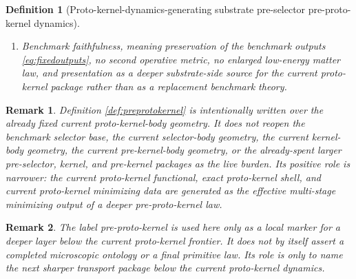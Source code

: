 \documentclass[11pt]{article}
\newcommand{\YoctoSelectorBody}[1]{\mathcal B_{#1}^{\mathrm{yoc,sel}}}
\newcommand{\YoctoSelectorShell}[1]{\mathcal Z_{#1}^{\mathrm{yoc,sel}}}
\newcommand{\PreSectionSelectorProj}[1]{\Pi_{#1}^{\mathrm{presel,sel}}}
\newcommand{\KernelProj}[1]{\Lambda_{#1}^{\mathrm{presel,ker}}}
\newcommand{\PreKernelProj}[1]{\Upsilon_{#1}^{\mathrm{presel,preker}}}
\newcommand{\ProtoKernelProj}[1]{\Omega_{#1}^{\mathrm{presel,proker}}}
\newcommand{\PreProtoKernelBody}[1]{\mathcal D_{#1}^{\mathrm{presel,preproker}}}
\newcommand{\PreProtoKernelProj}[1]{\Xi_{#1}^{\mathrm{presel,preproker}}}
\newcommand{\PreProtoKernelFunctional}[1]{\mathscr V_{#1}^{\mathrm{presel,preproker}}}
\newcommand{\PreProtoKernelFullFiber}[2]{\mathcal Q_{#1}^{\mathrm{presel,preproker,full}}(#2)}
\newcommand{\PreProtoKernelFullMin}[1]{\mathfrak d_{#1}^{\mathrm{presel,preproker}}}
\newcommand{\PreProtoKernelShell}[1]{\mathcal H_{#1}^{\mathrm{presel,preproker}}}
\newcommand{\InducedProtoKernelShell}[1]{\widetilde{\mathcal E}_{#1}^{\mathrm{presel,proker}}}
\newtheorem{definition}{Definition}
\newtheorem{remark}{Remark}
\begin{document}
\begin{definition}[Proto-kernel-dynamics-generating substrate pre-selector pre-proto-kernel dynamics]
\begin{enumerate}
\[    \]
    The restriction of \(\PreProtoKernelFunctional{\sigma}\) to \(\PreProtoKernelFullFiber{\sigma}{y}\) is required to attain a unique minimizer depending smoothly on \(y\); write it as
    \[
    \PreProtoKernelFullMin{\sigma}:\YoctoSelectorBody{\sigma}\to\PreProtoKernelBody{\sigma}.
    \]
    The exact pre-proto-kernel shell
    \[
    \PreProtoKernelShell{\sigma}
    \equiv
    \left\{
    r\in\PreProtoKernelBody{\sigma}:
    \PreSectionSelectorProj{\sigma}\bigl(\KernelProj{\sigma}(\PreKernelProj{\sigma}(\ProtoKernelProj{\sigma}(\PreProtoKernelProj{\sigma}(r))))\bigr)\in\YoctoSelectorShell{\sigma},
    \;
    \PreProtoKernelFunctional{\sigma}(r)
    =
    \min_{s\in\PreProtoKernelFullFiber{\sigma}{\PreSectionSelectorProj{\sigma}(\KernelProj{\sigma}(\PreKernelProj{\sigma}(\ProtoKernelProj{\sigma}(\PreProtoKernelProj{\sigma}(r)))))}}
    \PreProtoKernelFunctional{\sigma}(s)
    \right\}
    \]
    is required to be a closed embedded submanifold, and
    \[
    \PreProtoKernelProj{\sigma}\big|_{\PreProtoKernelShell{\sigma}}
    :
    \PreProtoKernelShell{\sigma}\xrightarrow{\cong}\InducedProtoKernelShell{\sigma}
    \]
    is required to be a diffeomorphism.
    \item Benchmark faithfulness, meaning preservation of the benchmark outputs \eqref{eq:fixedoutputs}, no second operative metric, no enlarged low-energy matter law, and presentation as a deeper substrate-side source for the current proto-kernel package rather than as a replacement benchmark theory.
\end{enumerate}
\end{definition}

\begin{remark}
Definition \ref{def:preprotokernel} is intentionally written over the already fixed current proto-kernel-body geometry. It does not reopen the benchmark selector base, the current selector-body geometry, the current kernel-body geometry, the current pre-kernel-body geometry, or the already-spent larger pre-selector, kernel, and pre-kernel packages as the live burden. Its positive role is narrower: the current proto-kernel functional, exact proto-kernel shell, and current proto-kernel minimizing data are generated as the effective multi-stage minimizing output of a deeper pre-proto-kernel law.
\end{remark}

\begin{remark}
The label \emph{pre-proto-kernel} is used here only as a local marker for a deeper layer below the current proto-kernel frontier. It does not by itself assert a completed microscopic ontology or a final primitive law. Its role is only to name the next sharper transport package below the current proto-kernel dynamics.
\end{remark}
\end{document}
